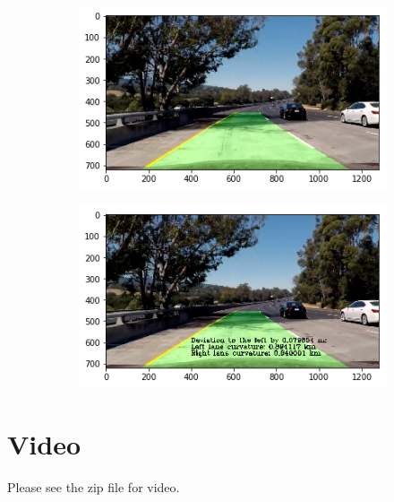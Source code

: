 \documentclass[draftcls,onecolumn,12pt]{IEEEtran}
\theoremstyle{plain}
\theoremstyle{plain}
\begin{document}
\begin{figure}[htb!!]
    \centering
   \begin{subfigure}[t]{0.45\textwidth}
        \includegraphics[width=\textwidth]{./figures/Mapped.png}\\
        \caption{}
    \end{subfigure}
    \hspace{-0.5cm}
    \begin{subfigure}[t]{0.45\textwidth}
        \includegraphics[width=\textwidth]{./figures/Annotated.png}\\
        \caption{}
    \end{subfigure}
    \caption{}\label{Fig:FilterFinal}
\end{figure}

\section{Video}
Please see the zip file for video.
\end{document}

